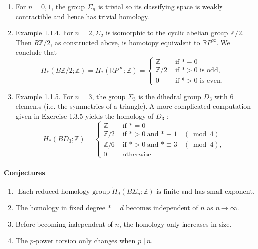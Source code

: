 \begin{example}
    \begin{enumerate}
        \item For $n=0,1$, the group $\Sigma_n$ is trivial so its classifying space is weakly contractible and hence has trivial homology.
        \item Example 1.1.4. For $n=2, \Sigma_2$ is isomorphic to the cyclic abelian group $\mathbb{Z} / 2$. Then $B \mathbb{Z} / 2$, as constructed above, is homotopy equivalent to $\mathbb{R} P^{\infty}$. We conclude that
        $$
        H_*(B \mathbb{Z} / 2 ; \mathbb{Z})=H_*\left(\mathbb{R} P^{\infty} ; \mathbb{Z}\right)= \begin{cases}\mathbb{Z} & \text { if } *=0 \\ \mathbb{Z} / 2 & \text { if } *>0 \text { is odd, } \\ 0 & \text { if } *>0 \text { is even. }\end{cases}
        $$
    \item
        Example 1.1.5. For $n=3$, the group $\Sigma_3$ is the dihedral group $D_3$ with 6 elements (i.e. the symmetries of a triangle). A more complicated computation given in Exercise 1.3.5 yields the homology of $D_3$ :
$$
H_*\left(B D_3 ; \mathbb{Z}\right)=\left\{\begin{array}{lll}
\mathbb{Z} & \text { if } *=0 \\
\mathbb{Z} / 2 & \text { if } *>0 \text { and } * \equiv 1 \quad(\bmod 4) \\
\mathbb{Z} / 6 & \text { if } *>0 \text { and } * \equiv 3 \quad(\bmod 4), \\
0 & \text { otherwise }
\end{array}\right.
$$
    \end{enumerate}
\end{example}

\paragraph*{Conjectures}

\begin{enumerate}
    \item $\text { Each reduced homology group } \widetilde{H}_d\left(B \Sigma_n ; \mathbb{Z}\right) \text { is finite and has small exponent. }$
    \item The homology in fixed degree $*=d$ becomes independent of $n$ as $n \rightarrow \infty$.
    \item Before becoming independent of $n$, the homology only increases in size.
    \item The $p$-power torsion only changes when $p \mid n$.
\end{enumerate}


